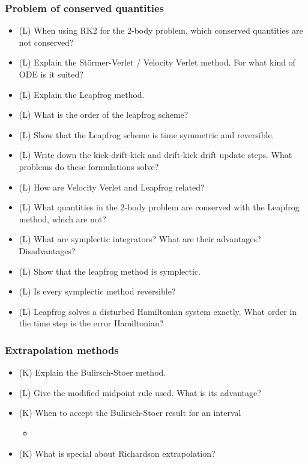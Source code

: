 \subsubsection*{Problem of conserved quantities}
\begin{itemize}
    \item (L) When using RK2 for the 2-body problem, which conserved quantities are not conserved?
    \answerboxS
    \item (L) Explain the Störmer-Verlet / Velocity Verlet method. For what kind of ODE is it suited?
    \answerboxL
    \item (L) Explain the Leapfrog method.
    \answerboxM
    \item (L) What is the order of the leapfrog scheme?
    \answerboxS
    \item (L) Show that the Leapfrog scheme is time symmetric and reversible.
    \answerboxM
    \item (L) Write down the kick-drift-kick and drift-kick drift update steps. What problems do these formulations solve?
    \answerboxL
    \item (L) How are Velocity Verlet and Leapfrog related?
    \answerboxM
    \item (L) What quantities in the 2-body problem are conserved with the Leapfrog method, which are not?
    \answerboxS
    \item (L) What are symplectic integrators? What are their advantages? Disadvantages?
    \answerboxM
    \item (L) Show that the leapfrog method is symplectic.
    \answerboxM
    \item (L) Is every symplectic method reversible?
    \answerboxS
    \item (L) Leapfrog solves a disturbed Hamiltonian system exactly. What order in the time step is the error Hamiltonian?
    \answerboxM
\end{itemize}

\subsubsection*{Extrapolation methods}
\begin{itemize}
    \item (K) Explain the Bulirsch-Stoer method.
    \answerboxL
    \item (L) Give the modified midpoint rule used. What is its advantage?
    \answerboxM
    \item (K) When to accept the Bulirsch-Stoer result for an interval
    \begin{itemize}
        \item {}
    \end{itemize}
    \answerboxS
    \item (K) What is special about Richardson extrapolation?
    \answerboxM
\end{itemize}

